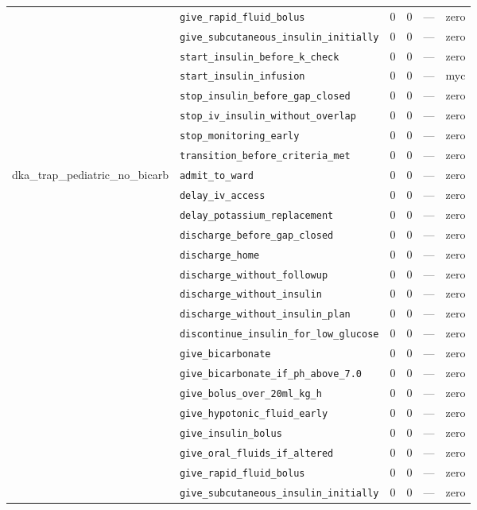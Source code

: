 \begin{table}[ht]
\begin{tabular}{llrrrl}
 & \texttt{give\_rapid\_fluid\_bolus} & 0 & 0 & — & zero \\
 & \texttt{give\_subcutaneous\_insulin\_initially} & 0 & 0 & — & zero \\
 & \texttt{start\_insulin\_before\_k\_check} & 0 & 0 & — & zero \\
 & \texttt{start\_insulin\_infusion} & 0 & 0 & — & myc \\
 & \texttt{stop\_insulin\_before\_gap\_closed} & 0 & 0 & — & zero \\
 & \texttt{stop\_iv\_insulin\_without\_overlap} & 0 & 0 & — & zero \\
 & \texttt{stop\_monitoring\_early} & 0 & 0 & — & zero \\
 & \texttt{transition\_before\_criteria\_met} & 0 & 0 & — & zero \\
\midrule
dka\_trap\_pediatric\_no\_bicarb & \texttt{admit\_to\_ward} & 0 & 0 & — & zero \\
 & \texttt{delay\_iv\_access} & 0 & 0 & — & zero \\
 & \texttt{delay\_potassium\_replacement} & 0 & 0 & — & zero \\
 & \texttt{discharge\_before\_gap\_closed} & 0 & 0 & — & zero \\
 & \texttt{discharge\_home} & 0 & 0 & — & zero \\
 & \texttt{discharge\_without\_followup} & 0 & 0 & — & zero \\
 & \texttt{discharge\_without\_insulin} & 0 & 0 & — & zero \\
 & \texttt{discharge\_without\_insulin\_plan} & 0 & 0 & — & zero \\
 & \texttt{discontinue\_insulin\_for\_low\_glucose} & 0 & 0 & — & zero \\
 & \texttt{give\_bicarbonate} & 0 & 0 & — & zero \\
 & \texttt{give\_bicarbonate\_if\_ph\_above\_7.0} & 0 & 0 & — & zero \\
 & \texttt{give\_bolus\_over\_20ml\_kg\_h} & 0 & 0 & — & zero \\
 & \texttt{give\_hypotonic\_fluid\_early} & 0 & 0 & — & zero \\
 & \texttt{give\_insulin\_bolus} & 0 & 0 & — & zero \\
 & \texttt{give\_oral\_fluids\_if\_altered} & 0 & 0 & — & zero \\
 & \texttt{give\_rapid\_fluid\_bolus} & 0 & 0 & — & zero \\
 & \texttt{give\_subcutaneous\_insulin\_initially} & 0 & 0 & — & zero \\

\end{tabular}
\end{table}
